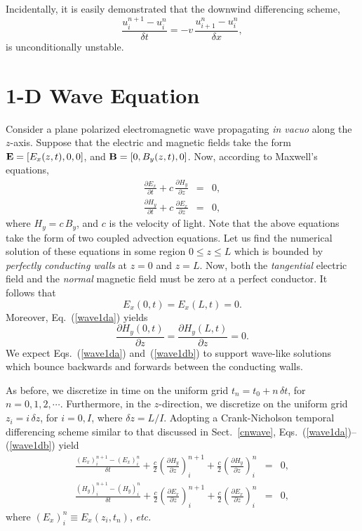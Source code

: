 Incidentally, it is easily demonstrated that the downwind differencing scheme,
\begin{equation}
\frac{u_i^{n+1} - u_i^n}{\delta t} = - v\,\frac{u_{i+1}^n-u_{i}^n}{\delta x},
\end{equation}
is unconditionally unstable.

\section{1-D Wave Equation}\label{swave1d}
Consider a plane polarized electromagnetic wave propagating {\em in vacuo} along the $z$-axis.
Suppose that the electric and magnetic fields take the form ${\bf E} = [E_x(z,t),0,0]$, and
${\bf B} = [0,B_y(z,t),0]$. Now, according to Maxwell's equations,
\begin{eqnarray}
\frac{\partial E_x}{\partial t} + c\,\frac{\partial H_y}{\partial z} &=& 0,\label{wave1da}\\[0.5ex]
\frac{\partial H_y}{\partial t} + c\,\frac{\partial E_x}{\partial z} &=& 0,\label{wave1db}
\end{eqnarray}
where $H_y = c\,B_y$, and $c$ is the velocity of light. Note that the above equations
take the form of two coupled advection equations.
Let us find the numerical 
solution of
these equations in some region $0\leq z \leq L$ which is bounded by 
{\em perfectly
conducting walls} at $z=0$ and $z=L$. Now, both the {\em tangential} electric field and
the {\em normal} magnetic field must be zero at a perfect conductor. It follows that
\begin{equation}\label{wavebca}
E_x(0,t) = E_x(L,t) = 0.
\end{equation}
Moreover, Eq.~(\ref{wave1da}) yields
\begin{equation}\label{wavebcb}
\frac{\partial H_y(0,t)}{\partial z} = \frac{\partial H_y(L,t)}{\partial z} = 0.
\end{equation}
We expect Eqs.~(\ref{wave1da}) and~(\ref{wave1db})  to support wave-like solutions which
bounce backwards and forwards between the conducting walls. 

As before, we discretize in time on the uniform grid $t_n=t_0+n\,\delta t$, for $n=0,1,2,\cdots$.
Furthermore, in the  $z$-direction, we discretize on the uniform grid $z_i = i\,\delta z$, for
$i=0,I$, where $\delta z = L/I$. Adopting a Crank-Nicholson  temporal differencing scheme
similar to that discussed in Sect.~\ref{cnwave}, Eqs.~(\ref{wave1da})--(\ref{wave1db}) yield
\begin{eqnarray}\label{cnwave1da}
\frac{(E_x)_i^{n+1}-(E_x)_i^n}{\delta t} +\frac{c}{2}\left(\frac{\partial H_y}{\partial z}\right)_i^{n+1}
+ \frac{c}{2}\left(\frac{\partial H_y}{\partial z}\right)_i^n&=& 0,\\[0.5ex]
\frac{(H_y)_i^{n+1}-(H_y)_i^n}{\delta t} +\frac{c}{2}\left(\frac{\partial E_x}{\partial z}\right)_i^{n+1}
+ \frac{c}{2}\left(\frac{\partial E_x}{\partial z}\right)_i^n&=& 0,\label{cnwave1db}
\end{eqnarray}
where $(E_x)_i^n\equiv E_x(z_i,t_n)$, {\em etc.}


